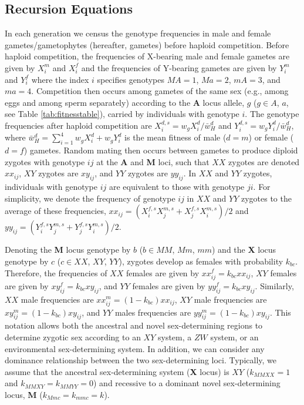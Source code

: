 \documentclass[12pt]{article}
\begin{document}
\subsection*{Recursion Equations}
\label{app:recurs}

In each generation we census the genotype frequencies in male and female gametes/gametophytes (hereafter, gametes) before haploid competition. 
Before haploid competition, the frequencies of X-bearing male and female gametes are given by $X_{i}^{m}$ and $X_{i}^{f}$ and the frequencies of Y-bearing gametes are given by $Y_{i}^{m}$ and $Y_{i}^{f}$ where the index $i$ specifies genotypes $MA=1$, $Ma=2$, $mA=3$, and $ma=4$. 
Competition then occurs among gametes of the same sex (e.g., among eggs and among sperm separately) according to the \textbf{A} locus allele, $g$ ($g\in A$, $a$, see Table \ref{tab:fitnesstable}), carried by individuals with genotype $i$.
The genotype frequencies after haploid competition are $X_{i}^{d,s}= w_{g}X_{i}^{d}/\bar{w}_{H}^{d}$ and $Y_{i}^{d,s}= w_{g}Y_{i}^{d}/\bar{w}_{H}^{d}$, where $\bar{w}_{H}^{d}=\sum_{i=1}^{4} w_{g}X_{i}^{d}+w_{g}Y_{i}^{d}$ is the mean fitness of male ($d=m$) or female ($d=f$) gametes. 
Random mating then occurs between gametes to produce diploid zygotes with genotype $ij$ at the \textbf{A} and \textbf{M} loci, such that $XX$ zygotes are denoted $xx_{ij}$, $XY$ zygotes are $xy_{ij}$, and $YY$ zygotes are $yy_{ij}$. 
In $XX$ and $YY$ zygotes, individuals with genotype $ij$ are equivalent to those with genotype $ji$. 
For simplicity, we denote the frequency of genotype $ij$ in $XX$ and $YY$ zygotes to the average of these frequencies, $xx_{ij}=(X_{i}^{f,s}X_{j}^{m,s}+X_{j}^{f,s}X_{i}^{m,s})/2$ and $yy_{ij}=(Y_{i}^{f,s}Y_{j}^{m,s}+Y_{j}^{f,s}Y_{i}^{m,s})/2$. 

Denoting the \textbf{M} locus genotype by $b$ ($b\in MM$, $Mm$, $mm$) and the \textbf{X} locus genotype by $c$ ($c\in XX$, $XY$, $YY$), zygotes develop as females with probability $k_{bc}$. 
Therefore, the frequencies of $XX$ females are given by $xx_{ij}^{f}=k_{bc}xx_{ij}$, $XY$ females are given by $xy_{ij}^{f}=k_{bc}xy_{ij}$, and $YY$ females are given by $yy_{ij}^{f}=k_{bc}xy_{ij}$. 
Similarly, $XX$ male frequencies are $xx_{ij}^{m}=(1-k_{bc})xx_{ij}$, $XY$ male frequencies are $xy_{ij}^{m}=(1-k_{bc})xy_{ij}$, and $YY$ males frequencies are $yy_{ij}^{m}=(1-k_{bc})xy_{ij}$.
This notation allows both the ancestral and novel sex-determining regions to determine zygotic sex according to an $XY$ system, a $ZW$ system, or an environmental sex-determining system. 
In addition, we can consider any dominance relationship between the two sex-determining loci. 
Typically, we assume that the ancestral sex-determining system (\textbf{X} locus) is $XY$ ($k_{MMXX}=1$ and $k_{MMXY}=k_{MMYY}=0$) and recessive to a dominant novel sex-determining locus, \textbf{M} ($k_{Mmc}=k_{mmc}=k$). 
\end{document}
